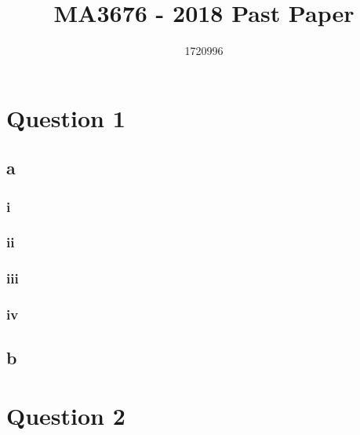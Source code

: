 \documentclass{article}
\title{MA3676 -  2018 Past Paper}
\author{1720996}
\begin{document}
\maketitle
\tableofcontents
\pagebreak

\section{Question 1}
\subsection{a}
\subsubsection{i}
\subsubsection{ii}
\subsubsection{iii}
\subsubsection{iv}
\subsection{b}

\pagebreak
\section{Question 2}
\end{document}
